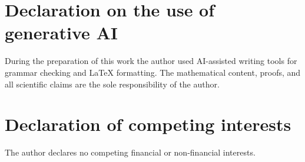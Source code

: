 \documentclass[preprint,12pt]{elsarticle}
\begin{document}
\section*{Declaration on the use of generative AI}
During the preparation of this work the author used AI-assisted
writing tools for grammar checking and LaTeX formatting.
The mathematical content, proofs, and all scientific claims
are the sole responsibility of the author.

\section*{Declaration of competing interests}
The author declares no competing financial or non-financial
interests.



\end{document}
